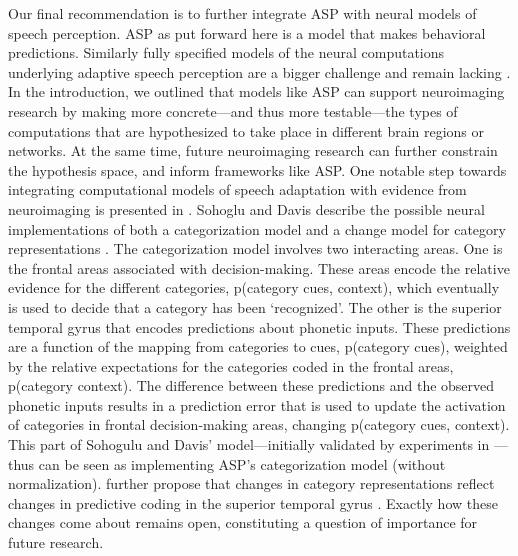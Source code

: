 \documentclass[
  11pt,
  man,floatsintext]{apa6}
\begin{document}
Our final recommendation is to further integrate ASP with neural models of speech perception. ASP as put forward here is a model that makes behavioral predictions. Similarly fully specified models of the neural computations underlying adaptive speech perception are a bigger challenge and remain lacking \autocites[but see][]{sohoglu-davis2016,sohoglu-davis2020}[for discussion, see][]{guediche2014}. In the introduction, we outlined that models like ASP can support neuroimaging research by making more concrete---and thus more testable---the types of computations that are hypothesized to take place in different brain regions or networks. At the same time, future neuroimaging research can further constrain the hypothesis space, and inform frameworks like ASP. One notable step towards integrating computational models of speech adaptation with evidence from neuroimaging is presented in \textcite{sohoglu-davis2016}. Sohoglu and Davis describe the possible neural implementations of both a categorization model and a change model for category representations \autocite[see also][]{sohoglu-davis2020}. The categorization model involves two interacting areas. One is the frontal areas associated with decision-making. These areas encode the relative evidence for the different categories, p(category \textbar{} cues, context), which eventually is used to decide that a category has been `recognized'. The other is the superior temporal gyrus that encodes predictions about phonetic inputs. These predictions are a function of the mapping from categories to cues, p(category \textbar{} cues), weighted by the relative expectations for the categories coded in the frontal areas, p(category \textbar{} context). The difference between these predictions and the observed phonetic inputs results in a prediction error that is used to update the activation of categories in frontal decision-making areas, changing p(category \textbar{} cues, context). This part of Sohogulu and Davis' model---initially validated by experiments in \textcite{sohoglu2014}---thus can be seen as implementing ASP's categorization model (without normalization). \textcite{sohoglu-davis2016} further propose that changes in category representations reflect changes in predictive coding in the superior temporal gyrus \autocites[see also][]{blank2016,wang2021}. Exactly how these changes come about remains open, constituting a question of importance for future research.
\end{document}
